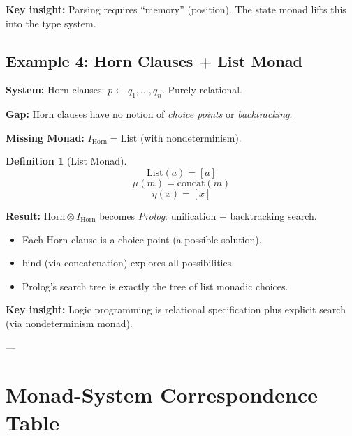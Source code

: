 \documentclass[a4paper,11pt]{article}
\theoremstyle{definition}
\newtheorem{definition}{Definition}[section]
\begin{document}
\textbf{Key insight:} Parsing requires ``memory'' (position). The state monad lifts this into the type system.

\subsection{Example 4: Horn Clauses + List Monad}

\textbf{System:} Horn clauses: $p \leftarrow q_1, \ldots, q_n$. Purely relational.

\textbf{Gap:} Horn clauses have no notion of \emph{choice points} or \emph{backtracking}.

\textbf{Missing Monad:} $I_{\text{Horn}} = \text{List}$ (with nondeterminism).

\begin{definition}[List Monad]
\[\text{List}(a) = [a]\]
\[\mu(m) = \text{concat}(m)\]
\[\eta(x) = [x]\]
\end{definition}

\textbf{Result:} $\text{Horn} \otimes I_{\text{Horn}}$ becomes \emph{Prolog}: unification + backtracking search.
\begin{itemize}
  \item Each Horn clause is a choice point (a possible solution).
  \item bind (via concatenation) explores all possibilities.
  \item Prolog's search tree is exactly the tree of list monadic choices.
\end{itemize}

\textbf{Key insight:} Logic programming is relational specification plus explicit search (via nondeterminism monad).

---

\section{Monad-System Correspondence Table}
\end{document}
